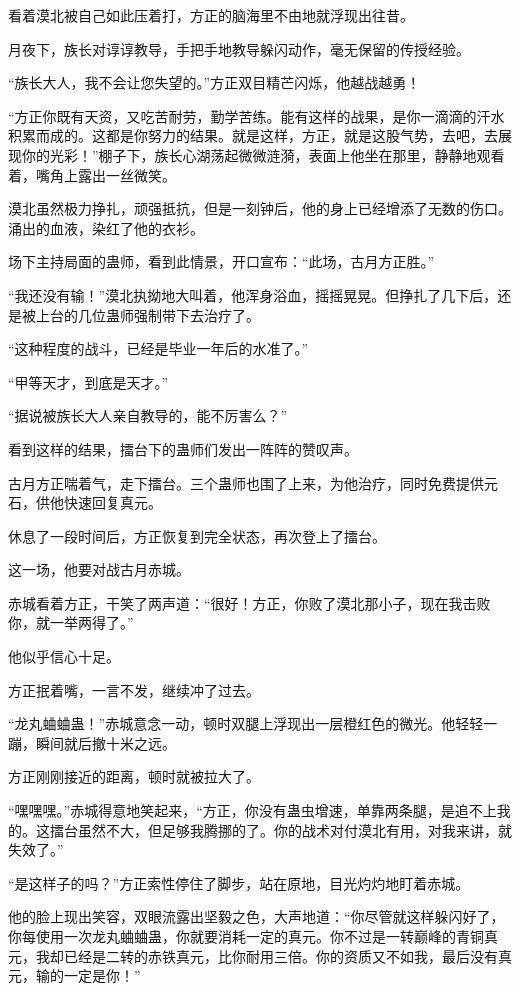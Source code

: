 \begin{this_body}
看着漠北被自己如此压着打，方正的脑海里不由地就浮现出往昔。

月夜下，族长对谆谆教导，手把手地教导躲闪动作，毫无保留的传授经验。

“族长大人，我不会让您失望的。”方正双目精芒闪烁，他越战越勇！

“方正你既有天资，又吃苦耐劳，勤学苦练。能有这样的战果，是你一滴滴的汗水积累而成的。这都是你努力的结果。就是这样，方正，就是这股气势，去吧，去展现你的光彩！”棚子下，族长心湖荡起微微涟漪，表面上他坐在那里，静静地观看着，嘴角上露出一丝微笑。

漠北虽然极力挣扎，顽强抵抗，但是一刻钟后，他的身上已经增添了无数的伤口。涌出的血液，染红了他的衣衫。

场下主持局面的蛊师，看到此情景，开口宣布：“此场，古月方正胜。”

“我还没有输！”漠北执拗地大叫着，他浑身浴血，摇摇晃晃。但挣扎了几下后，还是被上台的几位蛊师强制带下去治疗了。

“这种程度的战斗，已经是毕业一年后的水准了。”

“甲等天才，到底是天才。”

“据说被族长大人亲自教导的，能不厉害么？”

看到这样的结果，擂台下的蛊师们发出一阵阵的赞叹声。

古月方正喘着气，走下擂台。三个蛊师也围了上来，为他治疗，同时免费提供元石，供他快速回复真元。

休息了一段时间后，方正恢复到完全状态，再次登上了擂台。

这一场，他要对战古月赤城。

赤城看着方正，干笑了两声道：“很好！方正，你败了漠北那小子，现在我击败你，就一举两得了。”

他似乎信心十足。

方正抿着嘴，一言不发，继续冲了过去。

“龙丸蛐蛐蛊！”赤城意念一动，顿时双腿上浮现出一层橙红色的微光。他轻轻一蹦，瞬间就后撤十米之远。

方正刚刚接近的距离，顿时就被拉大了。

“嘿嘿嘿。”赤城得意地笑起来，“方正，你没有蛊虫增速，单靠两条腿，是追不上我的。这擂台虽然不大，但足够我腾挪的了。你的战术对付漠北有用，对我来讲，就失效了。”

“是这样子的吗？”方正索性停住了脚步，站在原地，目光灼灼地盯着赤城。

他的脸上现出笑容，双眼流露出坚毅之色，大声地道：“你尽管就这样躲闪好了，你每使用一次龙丸蛐蛐蛊，你就要消耗一定的真元。你不过是一转巅峰的青铜真元，我却已经是二转的赤铁真元，比你耐用三倍。你的资质又不如我，最后没有真元，输的一定是你！”


\end{this_body}
